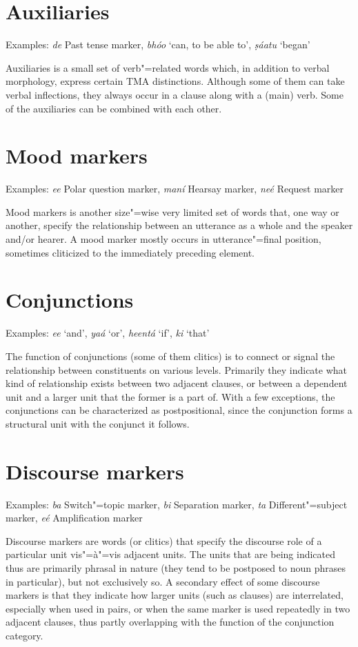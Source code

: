 \section{Auxiliaries}
\label{sec:3b-10}
Examples: \textit{de} Past tense marker, \textit{bhóo} `can, to be able to', \textit{ṣáatu} `began'


Auxiliaries is a small set of verb"=related words which, in addition to verbal morphology, express certain TMA distinctions. Although some of them can take verbal inflections, they always occur in a clause along with a (main) verb. Some of the auxiliaries can be combined with each other.


\section{Mood markers}
\label{sec:3b-11}
Examples: \textit{ee} Polar question marker, \textit{maní} Hearsay marker, \textit{neé} Request marker


Mood markers is another size"=wise very limited set of words that, one way or another, specify the relationship between an utterance as a whole and the speaker and/or hearer. A mood marker mostly occurs in utterance"=final position, sometimes cliticized to the immediately preceding element.


\section{Conjunctions}
\label{sec:3b-12}
Examples: \textit{ee} `and', \textit{yaá} `or', \textit{heentá} `if', \textit{ki} `that'


The function of conjunctions (some of them clitics) is to connect or signal the relationship between constituents on various levels. Primarily they indicate what kind of relationship exists between two adjacent clauses, or between a dependent unit and a larger unit that the former is a part of. With a few exceptions, the conjunctions can be characterized as postpositional, since the conjunction forms a structural unit with the conjunct it follows.


\section{Discourse markers}
\label{sec:3b-13}
Examples: \textit{ba} Switch"=topic marker, \textit{bi} Separation marker, \textit{ta} Different"=subject marker, \textit{eé} Amplification marker 


Discourse markers are words (or clitics) that specify the discourse role of a particular unit vis"=à"=vis adjacent units. The units that are being indicated thus are primarily phrasal in nature (they tend to be postposed to noun phrases in particular), but not exclusively so. A secondary effect of some discourse markers is that they indicate how larger units (such as clauses) are interrelated, especially when used in pairs, or when the same marker is used repeatedly in two adjacent clauses, thus partly overlapping with the function of the conjunction category.


